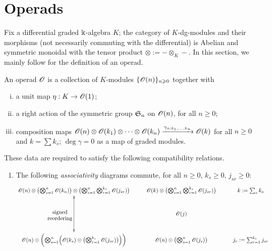 


\chapter{Operads}
\label{cha:operads}

Fix a differential graded $\Bbbk$-algebra $K$; the category of
$K$-dg-modules and their morphisms (not necessarily commuting with the
differential) is Abelian and symmetric monoidal with the tensor product
$\otimes := - \otimes_K -$.  In this section, we mainly follow
\cite{kriz-may;operads} for the definition of an operad.
\begin{definition}
  \label{dfn:operad}
  An operad ${\mathscr{O}_{}}$ is a collection of $K$-modules $\{{\mathscr{O}_{}}(n)\}_{n\geqslant0}$
  together with 
  \begin{enumerate}[i)]
  \item a unit map $\eta:K \to {\mathscr{O}_{}}(1)$; 
  \item a right action of the symmetric group $\mathfrak{S}_{n}$ on ${\mathscr{O}_{}}(n)$,
    for all $n\geq0$;
  \item composition maps ${\mathscr{O}_{}}(n)\otimes{\mathscr{O}_{}}(k_1)\otimes\cdots\otimes{\mathscr{O}_{}}(k_n) \xrightarrow{\gamma_{n;
        k_1, \ldots, k_n}} {\mathscr{O}_{}}(k)$ for all $n\geq0$ and $k = \sum k_s$; $\deg \gamma
    = 0$ as a map of graded modules.
  \end{enumerate}
  These data are required to satisfy the following compatibility
  relations.
  \begin{enumerate}
  \item\label{o-ass} The following \emph{associativity} diagrams
    commute, for all $n\geq0$, $k_s \geq0$, $j_{sr}\geq0$:
    \begin{equation}
      {\xymatrix{%
          {\Oo}(n) \otimes \bigl( \bigotimes_{s=1}^n {\Oo}(k_n) \bigr) \otimes \bigl( \bigotimes_{s=1}^n
          \bigotimes_{r=1}^{k_s} {\Oo}(j_{sr}) \bigr) 
          &
          {\Oo}(k) \otimes \bigl(\bigotimes_{s=1}^n \bigotimes_{r=1}^{k_s} {\Oo}(j_{sr}) \bigr)
          &
          k := \sum_s k_s
          \\
          &
          {\Oo}(j)
          \\
          {\Oo}(n) \otimes \biggl( \bigotimes_{s=1}^n \Bigl( {\Oo}(k_s) \otimes \bigl(
          \bigotimes_{r=1}^{k_s} {\Oo}(j_{sr}) \bigr) \Bigr) \biggr)
          &
          {\Oo}(n) \otimes \bigl( \bigotimes_{s=1}^n {\Oo}(j_s) \bigr)
          &
          j_r := \sum_{r=1}^{k_s} j_{sr}
          \ar@{<->}  "1,1";"3,1" _{\txt{signed \\ reordering}} 
}}
\end{equation}
\end{enumerate}
\end{definition}
